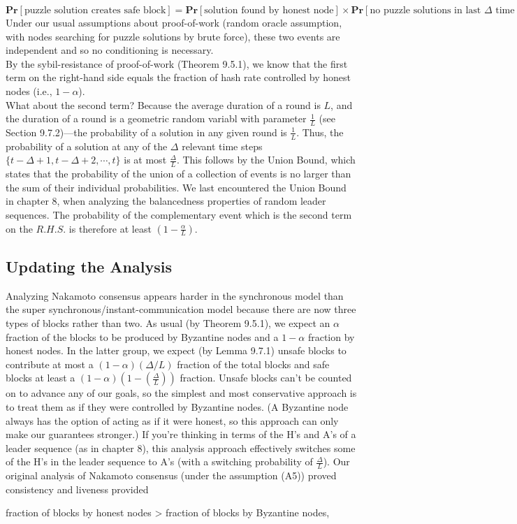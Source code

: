 $$\textbf{Pr}[\text{puzzle solution creates safe block}] = \textbf{Pr}[\text{solution found by honest node}] \times
\textbf{Pr}[\text{no puzzle solutions in last $\Delta$ time steps}]$$
Under our usual assumptions about proof-of-work (random oracle assumption, with nodes searching for
puzzle solutions by brute force), these two events are independent and so no conditioning is necessary.\\
By the sybil-resistance of proof-of-work (Theorem 9.5.1), we know that the first term on the
right-hand side equals the fraction of hash rate controlled by honest nodes (i.e., $1 - \alpha$).\\
What about the second term? Because the average duration of a round is $L$, and the
duration of a round is a geometric random variabl with parameter $\frac{1}{L}$ (see
Section 9.7.2)—the probability of a solution in any given round is $\frac{1}{L}$. Thus, the probability of a solution at any of the $\Delta$ relevant time steps
$\{t - \Delta + 1, t - \Delta + 2, \cdots, t\}$ is at most $\frac{\Delta}{L}$. This follows by the Union Bound, which states that the probability of the union of a collection of events is no larger than the sum of their individual probabilities. We last encountered the Union Bound in
chapter 8, when analyzing the balancedness properties of random leader sequences.
The probability of the complementary event which is the second term on the $R.H.S.$ is therefore at least $(1 - \frac{\alpha}{L})$.
\\

\subsection{Updating the Analysis}
Analyzing Nakamoto consensus appears harder in the synchronous model than the super synchronous/instant-communication model because there are now three types of blocks
rather than two. As usual (by Theorem 9.5.1), we expect an $\alpha$ fraction of the blocks to
be produced by Byzantine nodes and a $1 - \alpha$ fraction by honest nodes. In the latter group,
we expect (by Lemma 9.7.1) unsafe blocks to contribute at most a $(1 - \alpha)(\Delta/L)$ fraction of
the total blocks and safe blocks at least a $(1 - \alpha)(1 - (\frac{\Delta}{L}))$ fraction.
Unsafe blocks can’t be counted on to advance any of our goals, so the simplest and most
conservative approach is to treat them as if they were controlled by Byzantine nodes. (A
Byzantine node always has the option of acting as if it were honest, so this approach can
only make our guarantees stronger.) If you’re thinking in terms of the H’s and A’s of a leader
sequence (as in chapter 8), this analysis approach effectively switches some of the H’s in the
leader sequence to A’s (with a switching probability of $\frac{\Delta}{L}$).
Our original analysis of Nakamoto consensus (under the assumption (A5)) proved consistency
and liveness provided
\begin{center}
    fraction of blocks by honest nodes > fraction of blocks by Byzantine nodes,
\end{center}

